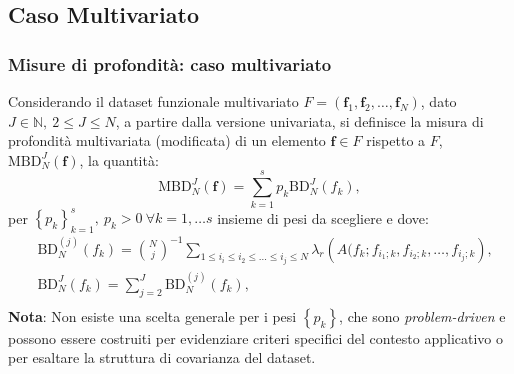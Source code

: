 \documentclass[9pt]{beamer}
\begin{document}
\subsection{Caso Multivariato}
\begin{frame}
\frametitle{Misure di profondit\`a: caso multivariato}
Considerando il dataset funzionale multivariato $F = \left( \mathbf{f}_1, \mathbf{f}_2, \ldots, \mathbf{f}_N \right)$, 
dato $J \in \mathbb{N},\ 2 \leq J  \leq N$, a partire dalla versione univariata, si definisce la misura di profondit\`a multivariata (modificata) di un elemento $\mathbf{f} \in F$ rispetto a $F$, $\text{MBD}^J_N\left(\mathbf{f} \right)$, la quantit\`a:
\[
 \text{MBD}^J_N\left( \mathbf{f} \right) = \sum_{k=1}^s p_k \text{BD}^{J}_N   \left(f_{k}\right),
\]
per  $\left\{p_k \right\}_{k=1}^s,\ p_k > 0 \ \forall k=1, \ldots s$ insieme di pesi da scegliere e dove:
\begin{align*}
& \text{BD}^{(j)}_N(f_k) = {N \choose j}^{-1} \sum_{1 \leq i_i \leq i_2 \leq \ldots \leq i_j \leq N } \lambda_r \left( A(f_k; f_{i_1;k}, f_{i_2;k}, \ldots, f_{i_j;k} \right),\\
& \text{BD}^J_N\left( f_k \right) = \sum_{j=2}^J \text{BD}^{(j)}_N\left(f_k \right),\\
\end{align*}
\textbf{Nota}: Non esiste una scelta generale per i pesi $\left\{p_k\right\}$, che sono \emph{problem-driven} e possono essere costruiti per evidenziare criteri specifici del contesto applicativo o per esaltare la struttura di covarianza del dataset.

\end{frame}
\end{document}
